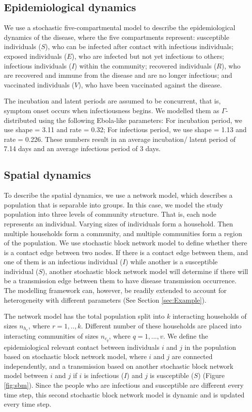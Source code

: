\documentclass[a4paper]{article}
\begin{document}
	\subsection{Epidemiological dynamics}
	We use a stochastic five-compartmental model to describe the epidemiological dynamics of the disease, where the five compartments represent: susceptible individuals ($S$), who can be infected after contact with infectious individuals; exposed individuals ($E$), who are infected but not yet infectious to others; infectious individuals ($I$) within the community; recovered individuals ($R$), who are recovered and immune from the disease and are no longer infectious; and vaccinated individuals ($V$), who have been vaccinated against the disease.
	
	The incubation and latent periods are assumed to be concurrent, that is, symptom onset occurs when infectiousness begins. We modelled them as $\Gamma$-distributed using the following Ebola-like parameters\cite{Hitchings2018AmJEpi}: For incubation period, we use shape = 3.11 and rate = 0.32; For infectious period, we use shape = 1.13 and rate = 0.226. These numbers result in an average incubation/ latent period of 7.14 days and an average infectious period of 3 days.
	
	\subsection{Spatial dynamics}
	To describe the spatial dynamics, we use a network model, which describes a population that is separable into groups. In this case, we model the study population into three levels of community structure. That is, each node represents an individual. Varying sizes of individuals form a household. Then multiple households form a community, and multiple communities form a region of the population. We use stochastic block network model to define whether there is a contact edge between two nodes. If there is a contact edge between them, and one of them is an infectious individual ($I$) while another is a susceptible individual ($S$), another stochastic block network model will determine if there will be a transmission edge between them to have disease transmission occurrence. The modelling framework can, however, be readily extended to account for heterogeneity with different parameters (See Section \ref{sec:Example}).
	
	The network model has the total population split into $k$ interacting households of sizes $n_{h_r}$, where $r = 1,..,k$. Different number of these households are placed into interacting communities of sizes $n_{c_q}$, where $q = 1,...,v$. We define the epidemiological relevant contact between individuals $i$ and $j$ in the population based on stochastic block network model\cite{Hitchings2018AmJEpi, Karrer2011arXiv}, where $i$ and $j$ are connected independently, and a transmission based on another stochastic block network model between $i$ and $j$ if $i$ is infectious ($I$) and $j$ is susceptible ($S$) (Figure \ref{fig:sbm}). Since the people who are infectious and susceptible are different every time step, this second stochastic block network model is dynamic and is updated every time step.
	
\end{document}
